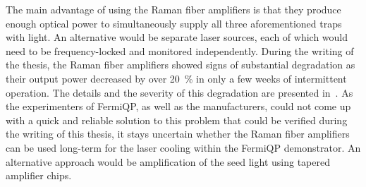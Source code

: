 The main advantage of using the Raman fiber amplifiers is that they produce enough optical power to simultaneously supply all three aforementioned traps with light. An alternative would be separate laser sources, each of which would need to be frequency-locked and monitored independently. During the writing of the thesis, the Raman fiber amplifiers showed signs of substantial degradation as their output power decreased by over \SI{20}{\percent} in only a few weeks of intermittent operation. The details and the severity of this degradation are presented in~\cite{qesja_design_2022}. As the experimenters of FermiQP, as well as the manufacturers, could not come up with a quick and reliable solution to this problem that could be verified during the writing of this thesis, it stays uncertain whether the Raman fiber amplifiers can be used long-term for the laser cooling within the FermiQP demonstrator. An alternative approach would be amplification of the seed light using tapered amplifier chips.


